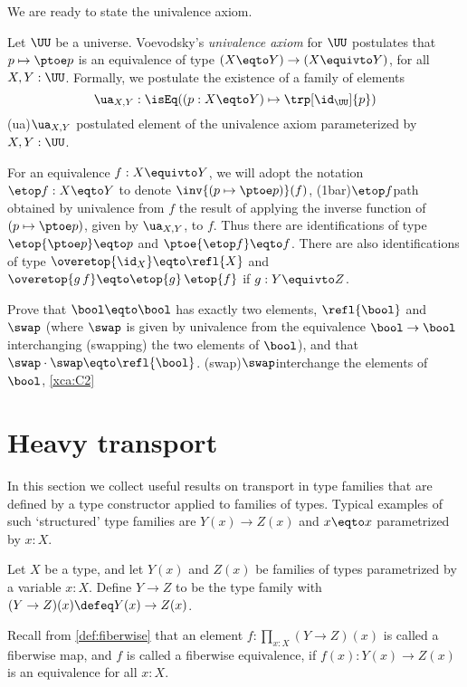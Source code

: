 We are ready to state the univalence axiom.

\begin{principle}\label{def:univalence}
    Let $\UU$ be a universe.
    Voevodsky's \emph{univalence axiom} for $\UU$
    postulates that $p\mapsto \ptoe p$ is an equivalence
    of type $(X \eqto Y) \to (X\equivto Y)$, for all $X,Y:\UU$.
    Formally, we postulate the existence of a family of elements
    \[
      \ua_{X,Y} : \isEq((p:X\eqto Y)\mapsto \trp[\id_\UU]{p})
    \]
    \glossary(ua){$\protect\ua_{X,Y}$}%
    {postulated element of the univalence axiom}%
    parameterized by $X,Y:\UU$.
\end{principle}

For an equivalence $f: X\equivto Y$, we will adopt the
notation $\etop f : X \eqto Y $ to denote $\inv{(p\mapsto\ptoe p)}(f)$,%
\glossary(1bar){$\protect\etop f$}{path obtained by univalence from $f$}
the result of applying the inverse function of $(p\mapsto\ptoe p)$,
given by $\ua_{X,Y}$, to $f$.
Thus there are identifications of type $\etop {\ptoe p} \eqto p$
and $\ptoe {\etop f} \eqto f$.  There are also identifications of
type $\overetop{\id_X} \eqto \refl{X}$
and $\overetop{g\,f} \eqto \etop{g}\,\etop{f}$ if $g: Y\equivto Z$.

\begin{xca}\label{xca:C2}
Prove that $\bool \eqto \bool$ has exactly two elements,
$\refl{\bool}$ and $\swap$ (where $\swap$ is given by
univalence from the equivalence $\bool\to\bool$ interchanging (swapping)
the two elements of $\bool$), and that $\swap\cdot\swap \eqto \refl{\bool}$.%
\glossary(swap){$\protect\swap$}{interchange the elements of $\bool$,
  \cref{xca:C2}}
\end{xca}


\section{Heavy transport}
\label{sec:heavy-transport}

In this section we collect useful results on transport in
type families that are defined by a type constructor applied
to families of types.
Typical examples of such `structured' type families are
$Y(x)\to Z(x)$ and $x \eqto x$ parametrized by $x:X$.

\begin{definition}\label{def:function-type-families}
Let $X$ be a type, and let $Y(x)$ and $Z(x)$ be families of types parametrized by a variable $x:X$.
Define $Y\to Z$ to be the type family
with $(Y\to Z)(x) \defeq Y(x)\to Z(x)$.
\end{definition}
Recall from \cref{def:fiberwise} that an element $f : \prod_{x:X}(Y\to Z)(x)$
is called a fiberwise map,
and $f$ is called a fiberwise equivalence,
if $f(x): Y(x)\to Z(x)$ is an equivalence for all $x:X$.

